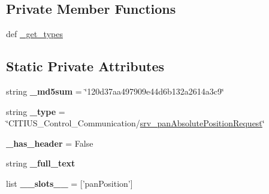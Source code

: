 \subsection*{\-Private \-Member \-Functions}
\begin{DoxyCompactItemize}
\item 
def \hyperlink{class_c_i_t_i_u_s___control___communication_1_1srv_1_1__srv__pan_absolute_position_1_1srv__pan_absolute_position_request_abb7142a45924dcce5f9c164488f7afa1}{\-\_\-get\-\_\-types}
\end{DoxyCompactItemize}
\subsection*{\-Static \-Private \-Attributes}
\begin{DoxyCompactItemize}
\item 
\hypertarget{class_c_i_t_i_u_s___control___communication_1_1srv_1_1__srv__pan_absolute_position_1_1srv__pan_absolute_position_request_ab2e137c38acc22ffba0c92d79f33c7f7}{string {\bfseries \-\_\-md5sum} = \char`\"{}120d37aa497909e44d6b132a2614a3c9\char`\"{}}\label{class_c_i_t_i_u_s___control___communication_1_1srv_1_1__srv__pan_absolute_position_1_1srv__pan_absolute_position_request_ab2e137c38acc22ffba0c92d79f33c7f7}

\item 
\hypertarget{class_c_i_t_i_u_s___control___communication_1_1srv_1_1__srv__pan_absolute_position_1_1srv__pan_absolute_position_request_ab861c548fe8ce41516ce5040f2b0e98c}{string {\bfseries \-\_\-type} = \char`\"{}\-C\-I\-T\-I\-U\-S\-\_\-\-Control\-\_\-\-Communication/\hyperlink{class_c_i_t_i_u_s___control___communication_1_1srv_1_1__srv__pan_absolute_position_1_1srv__pan_absolute_position_request}{srv\-\_\-pan\-Absolute\-Position\-Request}\char`\"{}}\label{class_c_i_t_i_u_s___control___communication_1_1srv_1_1__srv__pan_absolute_position_1_1srv__pan_absolute_position_request_ab861c548fe8ce41516ce5040f2b0e98c}

\item 
\hypertarget{class_c_i_t_i_u_s___control___communication_1_1srv_1_1__srv__pan_absolute_position_1_1srv__pan_absolute_position_request_aba7d4276da46a76c41e1c099f82a7970}{{\bfseries \-\_\-has\-\_\-header} = \-False}\label{class_c_i_t_i_u_s___control___communication_1_1srv_1_1__srv__pan_absolute_position_1_1srv__pan_absolute_position_request_aba7d4276da46a76c41e1c099f82a7970}

\item 
string {\bfseries \-\_\-full\-\_\-text}
\item 
\hypertarget{class_c_i_t_i_u_s___control___communication_1_1srv_1_1__srv__pan_absolute_position_1_1srv__pan_absolute_position_request_a9e1c9b45dfe857cbff96808816974c49}{list {\bfseries \-\_\-\-\_\-slots\-\_\-\-\_\-} = \mbox{[}'pan\-Position'\mbox{]}}\label{class_c_i_t_i_u_s___control___communication_1_1srv_1_1__srv__pan_absolute_position_1_1srv__pan_absolute_position_request_a9e1c9b45dfe857cbff96808816974c49}


\end{DoxyCompactItemize}
